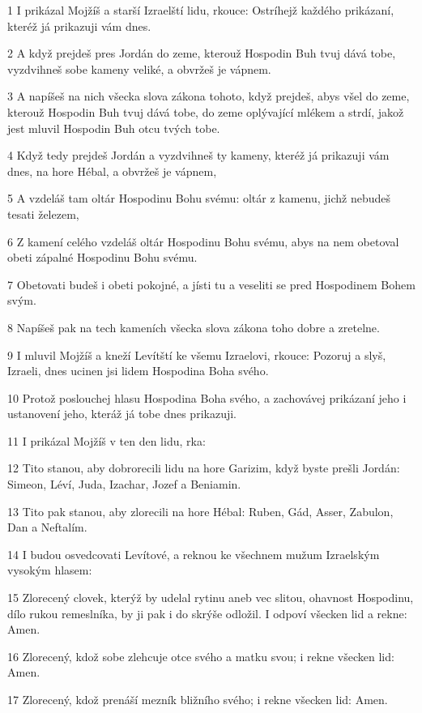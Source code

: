 \par 1 I prikázal Mojžíš a starší Izraelští lidu, rkouce: Ostríhejž každého prikázaní, kteréž já prikazuji vám dnes.
\par 2 A když prejdeš pres Jordán do zeme, kterouž Hospodin Buh tvuj dává tobe, vyzdvihneš sobe kameny veliké, a obvržeš je vápnem.
\par 3 A napíšeš na nich všecka slova zákona tohoto, když prejdeš, abys všel do zeme, kterouž Hospodin Buh tvuj dává tobe, do zeme oplývající mlékem a strdí, jakož jest mluvil Hospodin Buh otcu tvých tobe.
\par 4 Když tedy prejdeš Jordán a vyzdvihneš ty kameny, kteréž já prikazuji vám dnes, na hore Hébal, a obvržeš je vápnem,
\par 5 A vzdeláš tam oltár Hospodinu Bohu svému: oltár z kamenu, jichž nebudeš tesati železem,
\par 6 Z kamení celého vzdeláš oltár Hospodinu Bohu svému, abys na nem obetoval obeti zápalné Hospodinu Bohu svému.
\par 7 Obetovati budeš i obeti pokojné, a jísti tu a veseliti se pred Hospodinem Bohem svým.
\par 8 Napíšeš pak na tech kameních všecka slova zákona toho dobre a zretelne.
\par 9 I mluvil Mojžíš a kneží Levítští ke všemu Izraelovi, rkouce: Pozoruj a slyš, Izraeli, dnes ucinen jsi lidem Hospodina Boha svého.
\par 10 Protož poslouchej hlasu Hospodina Boha svého, a zachovávej prikázaní jeho i ustanovení jeho, kteráž já tobe dnes prikazuji.
\par 11 I prikázal Mojžíš v ten den lidu, rka:
\par 12 Tito stanou, aby dobrorecili lidu na hore Garizim, když byste prešli Jordán: Simeon, Léví, Juda, Izachar, Jozef a Beniamin.
\par 13 Tito pak stanou, aby zlorecili na hore Hébal: Ruben, Gád, Asser, Zabulon, Dan a Neftalím.
\par 14 I budou osvedcovati Levítové, a reknou ke všechnem mužum Izraelským vysokým hlasem:
\par 15 Zlorecený clovek, kterýž by udelal rytinu aneb vec slitou, ohavnost Hospodinu, dílo rukou remeslníka, by ji pak i do skrýše odložil. I odpoví všecken lid a rekne: Amen.
\par 16 Zlorecený, kdož sobe zlehcuje otce svého a matku svou; i rekne všecken lid: Amen.
\par 17 Zlorecený, kdož prenáší mezník bližního svého; i rekne všecken lid: Amen.
